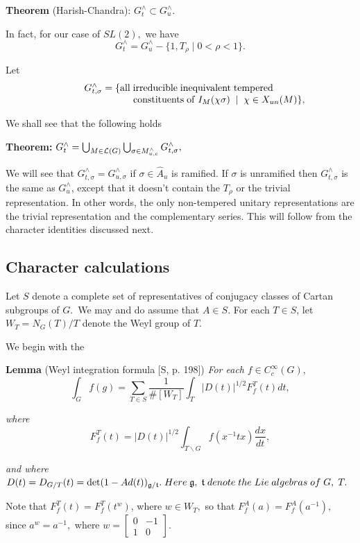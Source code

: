 {\bf Theorem} (Harish-Chandra): $G_t^{\wedge }\subset G_u^{\wedge }.$

In fact, for our case of $SL(2),$ we have 
\[
G_t^{\wedge }=G_u^{\wedge }-\{1,T_\rho \;|\;0<\rho <1\}. 
\]

Let 
\[
\begin{array}{c}
G_{t,\sigma }^{\wedge }=\{{\rm all\;irreducible\;inequivalent\;tempered\;}
\\ 
\;\;\;\;\;\;\;\;\;\;\;\;\;\;\;\;\;\;\;\;\;\;\;\;\;\;\;\;\;{\rm %
constituents\;of\;}I_M(\chi \sigma )\;\;|\;\;\chi \in X_{un}(M)\},
\end{array}
\]

We shall see that the following holds

{\bf Theorem:} $G_t^{\wedge }=\bigcup_{M\in {\cal L}(G)}\bigcup_{\sigma \in
M_{u,c}^{\wedge }}G_{t,\sigma }^{\wedge },$

We will see that $G_{t,\sigma }^{\wedge }=G_{u,\sigma }^{\wedge }$ if $%
\sigma\in\hat{A}_u$ is ramified. If $\sigma$ is unramified then $G_{t,\sigma
}^{\wedge }$ is the same as $G_{u}^{\wedge }$, except that it doesn't
contain the $T_\rho$ or the trivial representation. In other words, the only
non-tempered unitary representations are the trivial representation and the
complementary series. This will follow from the character identities
discussed next.

\subsection{Character calculations}

Let $S$ denote a complete set of representatives of conjugacy classes of
Cartan subgroups of $G$.\ We may and do assume that $A\in S.$ For each $T\in
S$, let $W_T=N_G(T)/T$ denote the Weyl group of $T$.

We begin with the

{\bf Lemma} (Weyl integration formula [S, p. 198]) {\em For each }$f\in
C_c^\infty (G),$%
\[
\int_Gf(g)=\sum_{T\in S}\frac 1{\#[W_T]}\int_T|D(t)|^{1/2}F_f^T(t)dt, 
\]

{\em where} 
\[
F_f^T(t)=|D(t)|^{1/2}\int_{T\backslash G}f(x^{-1}tx)\frac{dx}{dt}, 
\]

{\em and where }$D(t)=D_{G/T}(t)=\det (1-Ad(t))_{{\frak g}/{\frak t}%
}.\;Here\;{\frak g},\;{\frak t}\;denote\;the\;Lie\;algebras\;of\;G,\;T.$

Note that $F_f^T(t)=F_f^T(t^w)$, where $w\in W_T,$ so that $%
F_f^A(a)=F_f^A(a^{-1}),$ since $a^w=a^{-1},$ where $w=\left[ 
\begin{array}{cc}
0 & -1 \\ 
1 & 0
\end{array}
\right] .$

